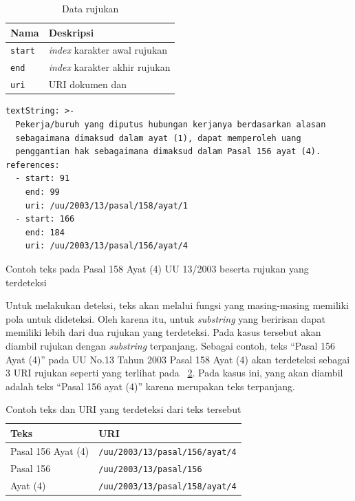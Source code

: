 \begin{table}
  \centering
  \begin{tabular}{|l|l|} \hline
    Nama           & Deskripsi                             \\\hline \hline
    \texttt{start} & \textit{index} karakter awal rujukan  \\\hline
    \texttt{end}   & \textit{index} karakter akhir rujukan \\\hline
    \texttt{uri}   & URI dokumen dan                       \\\hline
  \end{tabular}
  \caption{Data rujukan}
  \label{tab:info-rujukan}
\end{table}

\begin{listing}[H]
  \begin{verbatim}
textString: >-
  Pekerja/buruh yang diputus hubungan kerjanya berdasarkan alasan
  sebagaimana dimaksud dalam ayat (1), dapat memperoleh uang
  penggantian hak sebagaimana dimaksud dalam Pasal 156 ayat (4).
references:
  - start: 91
    end: 99
    uri: /uu/2003/13/pasal/158/ayat/1
  - start: 166
    end: 184
    uri: /uu/2003/13/pasal/156/ayat/4
  \end{verbatim}
  \caption{Contoh teks pada Pasal 158 Ayat (4) UU 13/2003 beserta rujukan yang terdeteksi}
  \label{lst:uu-13-2003-detect}
\end{listing}

Untuk melakukan deteksi, teks akan melalui fungsi yang masing-masing memiliki pola untuk dideteksi.
Oleh karena itu, untuk \textit{substring} yang beririsan dapat memiliki lebih dari dua rujukan yang
terdeteksi. Pada kasus tersebut akan diambil rujukan dengan \textit{substring} terpanjang. Sebagai
contoh, teks ``Pasal 156 Ayat (4)'' pada UU No.13 Tahun 2003 Pasal 158 Ayat (4) akan terdeteksi
sebagai 3 URI rujukan seperti yang terlihat pada \tab~\ref{tab:contoh-teks-uri}. Pada kasus ini,
yang akan diambil adalah teks ``Pasal 156 ayat (4)'' karena merupakan teks terpanjang.

\begin{table}
  \centering
  \begin{tabular}{|l|l|} \hline
    Teks               & URI                                   \\\hline \hline
    Pasal 156 Ayat (4) & \texttt{/uu/2003/13/pasal/156/ayat/4} \\\hline
    Pasal 156          & \texttt{/uu/2003/13/pasal/156}        \\\hline
    Ayat (4)           & \texttt{/uu/2003/13/pasal/158/ayat/4} \\\hline
  \end{tabular}
  \caption{Contoh teks dan URI yang terdeteksi dari teks tersebut}
  \label{tab:contoh-teks-uri}
\end{table}


